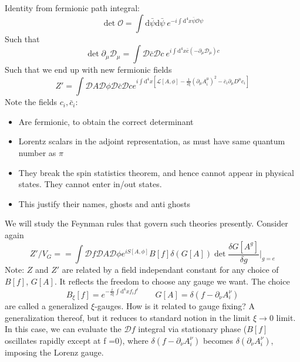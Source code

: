 \documentclass[a4paper]{book}
\theoremstyle{definition}
\theoremstyle{remark}
\begin{document}
Identity from fermionic path integral: 
\begin{equation}
    \det \mathcal O = \int \text{d}\bar \psi \text{d} \bar \psi ~e^{-i \int \text{d}^4x \bar\psi \mathcal O \psi} 
\end{equation}
Such that 
\begin{equation}
    \det \partial_\mu \mathcal D _\mu = \int \mathcal D\bar{c}\mathcal D c~ e^{i\int \text{d}^4 x \bar c (-\partial_\mu \mathcal D _\mu)c}
\end{equation}
Such that we end up with new fermionic fields 
\begin{equation}
    Z' = \int \mathcal D A \mathcal D \phi \mathcal D \bar c \mathcal D c e^{i\int \text{d}^4 x \left[\mathcal L [A, \phi] - \frac{1}{2\xi}(\partial_\mu A^\mu _i )^2 - \bar c_i \partial_\mu D^\mu c_i\right]}
\end{equation}
Note the fields $c_i, \bar c_i$: 
\begin{itemize}
    \item Are fermionic, to obtain the correct determinant
    \item Lorentz scalars in the adjoint representation, as must have same quantum number as $\pi$
    \item They break the spin statistics theorem, and hence cannot appear in physical states. They cannot enter in/out states. 
    \item This justify their names, ghosts and anti ghosts
\end{itemize}

We will study the Feynman rules that govern such theories presently. Consider again 
\begin{equation}
    Z'/V_G = = \int \mathcal D f \mathcal D A \mathcal D \phi e^{iS[A, \phi]} B[f] \delta(G[A]) \det \frac{\delta G[A^{ g}]}{\delta  g} \Bigg|_{ g = e} 
\end{equation}
Note: $Z$ and $Z'$ are related by a field independant constant for any choice of $B[f]$, $G[A]$. It reflects the freedom to choose any gauge we want. The choice 
\begin{equation}
    B_\xi[f] = e^{-\frac{i}{2\xi}\int \text{d}^4x f_if^i}\qquad G[A] = \delta (f - \partial_\nu A^\nu_i )
\end{equation}
are called a generalized $\xi$-gauges. How is it related to gauge fixing? A generalization thereof, but it reduces to standard notion in the limit $\xi \rightarrow 0$ limit. In this case, we can evaluate the $\mathcal D f$ integral via stationary phase ($B[f]$ oscillates rapidly except at f =0), where $ \delta (f - \partial_\nu A^\nu_i )$ becomes $ \delta (\partial_\nu A^\nu_i )$, imposing the Lorenz gauge. 
\end{document}
